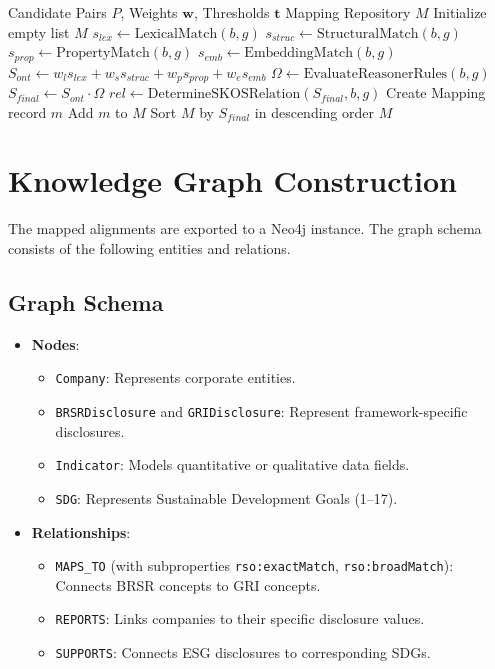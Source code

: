 \documentclass[journal,compsoc]{IEEEtran}
\begin{document}
\begin{algorithm}
\caption{Ontology Mapping Engine}
\label{alg:align}
\begin{algorithmic}[1]
\REQUIRE Candidate Pairs $P$, Weights $\mathbf{w}$, Thresholds $\mathbf{t}$
\ENSURE Mapping Repository $M$
\STATE Initialize empty list $M$
    \STATE $s_{lex} \leftarrow \text{LexicalMatch}(b, g)$
    \STATE $s_{struc} \leftarrow \text{StructuralMatch}(b, g)$
    \STATE $s_{prop} \leftarrow \text{PropertyMatch}(b, g)$
    \STATE $s_{emb} \leftarrow \text{EmbeddingMatch}(b, g)$
    \STATE $S_{ont} \leftarrow w_l s_{lex} + w_s s_{struc} + w_p s_{prop} + w_e s_{emb}$
    \STATE $\Omega \leftarrow \text{EvaluateReasonerRules}(b, g)$
    \STATE $S_{final} \leftarrow S_{ont} \cdot \Omega$
        \STATE $rel \leftarrow \text{DetermineSKOSRelation}(S_{final}, b, g)$
        \STATE Create Mapping record $m$
        \STATE Add $m$ to $M$
    \ENDIF
\ENDFOR
\STATE Sort $M$ by $S_{final}$ in descending order
\RETURN $M$
\end{algorithmic}
\end{algorithm}

\section{Knowledge Graph Construction}
The mapped alignments are exported to a Neo4j instance. The graph schema consists of the following entities and relations.

\subsection{Graph Schema}
\begin{itemize}
    \item \textbf{Nodes}:
        \begin{itemize}
            \item \texttt{Company}: Represents corporate entities.
            \item \texttt{BRSRDisclosure} and \texttt{GRIDisclosure}: Represent framework-specific disclosures.
            \item \texttt{Indicator}: Models quantitative or qualitative data fields.
            \item \texttt{SDG}: Represents Sustainable Development Goals (1--17).
        \end{itemize}
    \item \textbf{Relationships}:
        \begin{itemize}
            \item \texttt{MAPS\_TO} (with subproperties \texttt{rso:exactMatch}, \texttt{rso:broadMatch}): Connects BRSR concepts to GRI concepts.
            \item \texttt{REPORTS}: Links companies to their specific disclosure values.
            \item \texttt{SUPPORTS}: Connects ESG disclosures to corresponding SDGs.
        \end{itemize}
\end{itemize}
\end{document}
